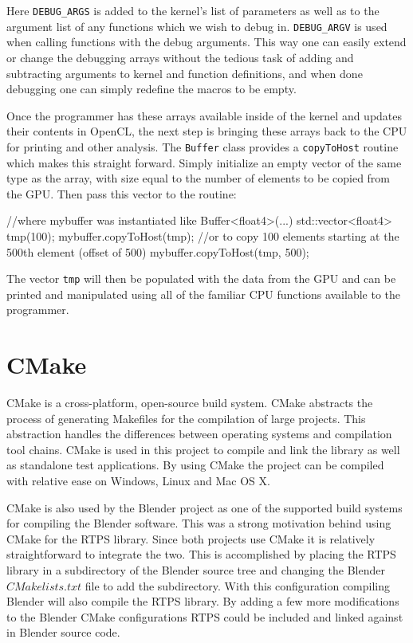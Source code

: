 Here \verb|DEBUG_ARGS| is added to the kernel's list of parameters as well as
to the argument list of any functions which we wish to debug in.
\verb|DEBUG_ARGV| is used when calling functions with the debug arguments. This
way one can easily extend or change the debugging arrays without the tedious
task of adding and subtracting arguments to kernel and function definitions,
and when done debugging one can simply redefine the macros to be empty.

Once the programmer has these arrays available inside of the kernel and updates
their contents in OpenCL, the next step is bringing these arrays back to the
CPU for printing and other analysis. The \verb|Buffer| class provides a
\verb|copyToHost| routine which makes this straight forward. Simply initialize
an empty vector of the same type as the array, with size equal to the
number of elements to be copied from the GPU. Then pass this vector to the routine:
\begin{cppcode}{0}
//where mybuffer was instantiated like Buffer<float4>(...)
std::vector<float4> tmp(100);
mybuffer.copyToHost(tmp);
//or to copy 100 elements starting at the 500th element (offset of 500)
mybuffer.copyToHost(tmp, 500);
\end{cppcode}

The vector \verb|tmp| will then be populated with the data from the GPU and can
be printed and manipulated using all of the familiar CPU functions available to
the programmer. 

\section{CMake}
CMake is a cross-platform, open-source build system.\cite{CMake} CMake
abstracts the process of generating Makefiles for the compilation of large
projects. This abstraction handles the differences between operating systems
and compilation tool chains. CMake is used in this project to compile and link
the library as well as standalone test applications. By using CMake the project
can be compiled with relative ease on Windows, Linux and Mac OS X.


CMake is also used by the Blender project as one of the supported build systems
for compiling the Blender software. This was a strong motivation behind using
CMake for the RTPS library. Since both projects use CMake it is relatively
straightforward to integrate the two. This is accomplished by placing the RTPS
library in a subdirectory of the Blender source tree and changing the Blender
$CMakelists.txt$ file to add the subdirectory. With this configuration
compiling Blender will also compile the RTPS library. By adding a few more
modifications to the Blender CMake configurations RTPS could be included and
linked against in Blender source code.



